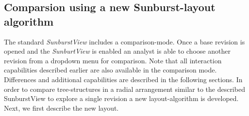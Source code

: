 \subsection{Comparsion using a new Sunburst-layout algorithm}\label{subsec::comparison}
The standard \emph{SunburstView} includes a comparison-mode. Once a base revision is opened and the \emph{SunburtView} is enabled an analyst is able to choose another revision from a dropdown menu for comparison. Note that all interaction capabilities described earlier are also available in the comparison mode. Differences and additional capabilities are described in the following sections. In order to compare tree-structures in a radial arrangement similar to the described SunburstView to explore a single revision a new layout-algorithm is developed. Next, we first describe the new layout.


